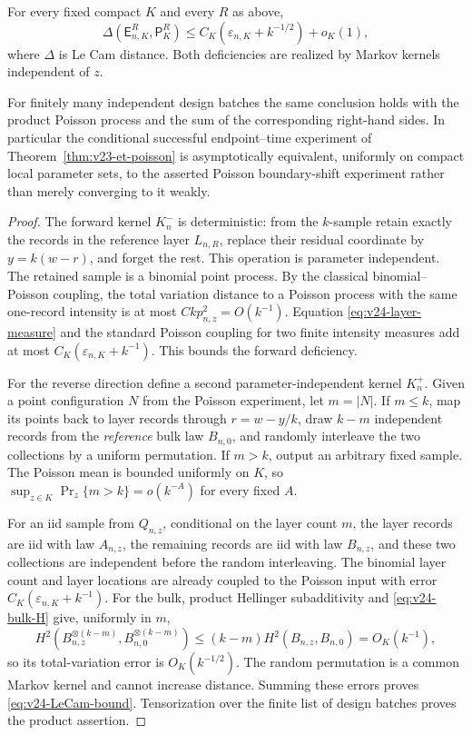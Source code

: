 \begin{theorem}
\label{thm:v24-two-sided-deficiency}
For every fixed compact \(K\) and every \(R\) as above,
\begin{equation}\label{eq:v24-LeCam-bound}
 \Delta(\mathsf E_{n,K}^R,\mathsf P_K^R)
 \le C_K\left(
       \varepsilon_{n,K}+k^{-1/2}
             \right)+o_K(1),
\end{equation}
where \(\Delta\) is Le Cam distance.  Both deficiencies are realized by
Markov kernels independent of \(z\).

For finitely many independent design batches the same conclusion holds with
the product Poisson process and the sum of the corresponding right-hand
sides.  In particular the conditional successful endpoint--time experiment
of Theorem~\ref{thm:v23-et-poisson} is asymptotically equivalent, uniformly on
compact local parameter sets, to the asserted Poisson boundary-shift
experiment rather than merely converging to it weakly.
\end{theorem}

\begin{proof}
The forward kernel \(K_n^-\) is deterministic: from the \(k\)-sample retain
exactly the records in the reference layer \(L_{n,R}\), replace their residual
coordinate by \(y=k(w-r)\), and forget the rest.  This operation is
parameter independent.  The retained sample is a binomial point process.
By the classical binomial--Poisson coupling, the total variation distance to
a Poisson process with the same one-record intensity is at most
\(Ckp_{n,z}^2=O(k^{-1})\).  Equation
\eqref{eq:v24-layer-measure} and the standard Poisson coupling for two finite
intensity measures add at most
\(C_K(\varepsilon_{n,K}+k^{-1})\).  This bounds the forward deficiency.

For the reverse direction define a second parameter-independent kernel
\(K_n^+\).  Given a point configuration \(N\) from the Poisson experiment,
let \(m=|N|\).  If \(m\le k\), map its points back to layer records through
\(r=w-y/k\), draw \(k-m\) independent records from the \emph{reference}
bulk law \(B_{n,0}\), and randomly interleave the two collections by a
uniform permutation.  If \(m>k\), output an arbitrary fixed sample.  The
Poisson mean is bounded uniformly on \(K\), so
\(\sup_{z\in K}\Pr_z\{m>k\}=o(k^{-A})\) for every fixed \(A\).

For an iid sample from \(Q_{n,z}\), conditional on the layer count \(m\), the
layer records are iid with law \(A_{n,z}\), the remaining records are iid with
law \(B_{n,z}\), and these two collections are independent before the random
interleaving.  The binomial layer count and layer locations are already
coupled to the Poisson input with error
\(C_K(\varepsilon_{n,K}+k^{-1})\).  For the bulk,
product Hellinger subadditivity and \eqref{eq:v24-bulk-H} give, uniformly in
\(m\),
\[
 H^2(B_{n,z}^{\otimes(k-m)},B_{n,0}^{\otimes(k-m)})
 \le (k-m)H^2(B_{n,z},B_{n,0})=O_K(k^{-1}),
\]
so its total-variation error is \(O_K(k^{-1/2})\).  The random permutation is
a common Markov kernel and cannot increase distance.  Summing these errors
proves \eqref{eq:v24-LeCam-bound}.  Tensorization over the finite list of
design batches proves the product assertion.
\end{proof}

